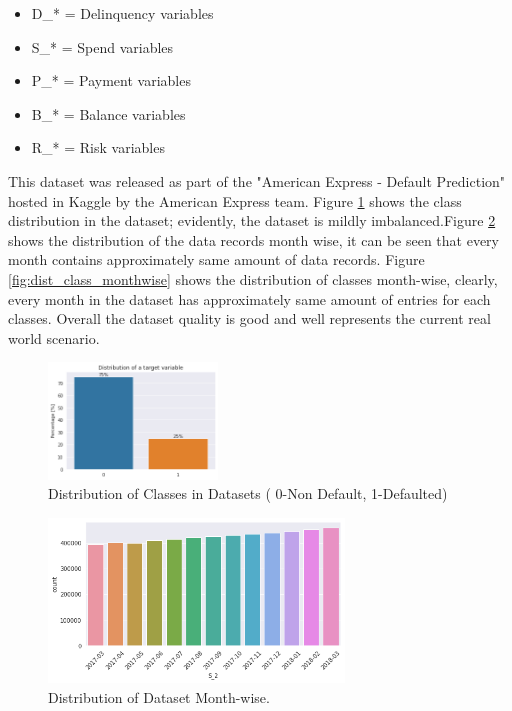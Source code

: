 \documentclass[twoside,11pt,a4paper]{article}
\begin{document}
\begin{itemize}
	\item D\_* = Delinquency variables
	\item S\_* = Spend variables
	\item P\_* = Payment variables
	\item B\_* = Balance variables
	\item R\_* = Risk variables	
\end{itemize}

This dataset\citep{amex-default-prediction-dataset} was released as part of the "American Express - Default Prediction" hosted in Kaggle by the American Express team. Figure \ref{fig:dataset_dist} shows the class distribution in the dataset; evidently, the dataset is mildly imbalanced.Figure \ref{fig:dataset_dist_monthwise} shows the distribution of the data records month wise, it can be seen that every month contains approximately same amount of data records. Figure \ref{fig:dist_class_monthwise} shows the distribution of classes month-wise, clearly, every month in the dataset has approximately same amount of entries for each classes. Overall the dataset quality is good and well represents the current real world scenario.\\

\begin{figure}[ht]
	\centering
	\includegraphics[width=0.4\textwidth]{dataset_dist}
	\caption[Distribution of Classes in Dataset]{Distribution of Classes in Datasets ( 0-Non Default, 1-Defaulted)}
	\label{fig:dataset_dist}
\end{figure}
\FloatBarrier
\begin{figure}[ht]
	\centering
	\includegraphics[width=0.7\textwidth]{dataset_dist_monthwise}
	\caption[Distribution of Dataset Month-wise]{Distribution of Dataset Month-wise.}
	\label{fig:dataset_dist_monthwise}
\end{figure}
\FloatBarrier
\end{document}

